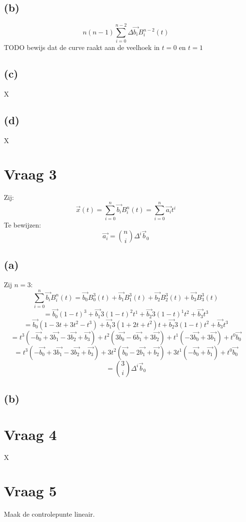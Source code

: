\documentclass[10pt,a4paper]{article}
\begin{document}
\subsection*{(b)}
\[
n(n-1)
\sum_{i=0}^{n-2}\Delta\vec{b_{i}}B^{n-2}_{i}(t)
\]
TODO bewijs dat de curve raakt aan de veelhoek in $t=0$ en $t=1$

\subsection*{(c)}
X
\subsection*{(d)}
X

\section{Vraag 3}
Zij:
\[
\vec{x}(t) = \sum_{i=0}^{n}\vec{b_{i}}B^{n}_{i}(t) = \sum_{i=0}^{n}\vec{a_{i}}t^i
\]
Te bewijzen:
\[
\vec{a_i} = \binom{n}{i}\Delta^i\vec{b}_0
\]
\subsection*{(a)}
Zij $n=3$:
\[
\sum_{i=0}^{n}\vec{b_{i}}B^{n}_{i}(t)
= \vec{b_{0}}B^{3}_{0}(t)
+ \vec{b_{1}}B^{3}_{1}(t)
+ \vec{b_{2}}B^{3}_{2}(t)
+ \vec{b_{3}}B^{3}_{3}(t)
\]
\[
= \vec{b_{0}}(1-t)^{3}
+ \vec{b_{1}}3(1-t)^{2}t^{1}
+ \vec{b_{2}}3(1-t)^{1}t^{2}
+ \vec{b_{3}}t^{3}
\]
\[
= \vec{b_{0}}(1-3t+3t^2-t^3)
+ \vec{b_{1}}3(1+2t+t^2)t
+ \vec{b_{2}}3(1-t)t^{2}
+ \vec{b_{3}}t^{3}
\]
\[
= t^3(- \vec{b_0}+3\vec{b_1}-3\vec{b_2}+\vec{b_3})
+ t^2( 3\vec{b_0}-6\vec{b_1}+3\vec{b_2})
+ t^1(-3\vec{b_0}+3\vec{b_1})
+ t^0   \vec{b_0}
\]
\[
=  t^3(-\vec{b_0}+3\vec{b_1}-3\vec{b_2}+\vec{b_3})
+ 3t^2( \vec{b_0}-2\vec{b_1}+ \vec{b_2})
+ 3t^1(-\vec{b_0}+ \vec{b_1})
+  t^0  \vec{b_0}
\]
\[
= \binom{3}{i}\Delta^i\vec{b}_0
\]

\subsection*{(b)}

\section{Vraag 4}
X

\section{Vraag 5}
Maak de controlepunte lineair.
\end{document}
